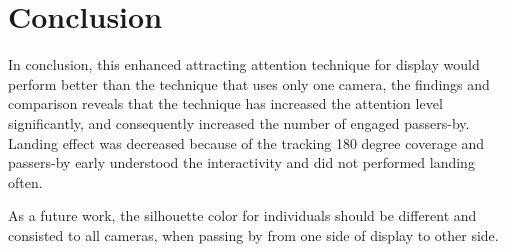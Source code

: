 \section{Conclusion}
In conclusion, this enhanced attracting attention technique for display would perform better than the technique that uses only one camera, the findings and comparison reveals that the technique has increased the attention level significantly, and consequently increased the number of engaged passers-by. Landing effect was decreased because of the tracking 180 degree coverage and passers-by early understood the interactivity and did not performed landing often. 

As a future work, the silhouette color for individuals should be different and consisted to all cameras, when passing by from one side of display to other side. 


